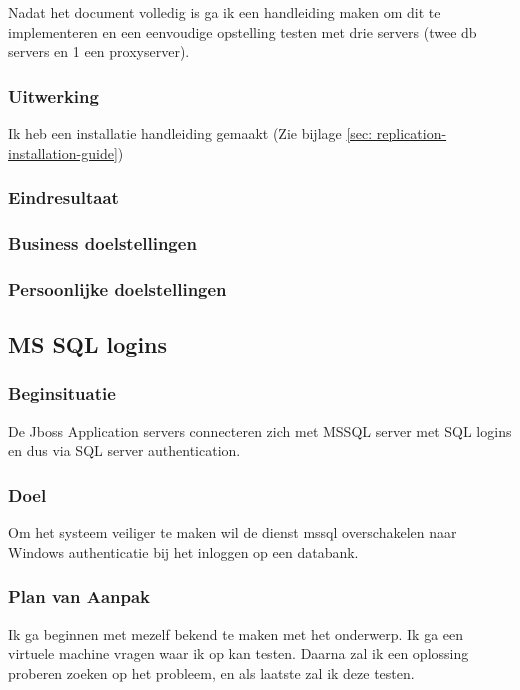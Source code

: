 Nadat het document volledig is ga ik een handleiding maken om dit te implementeren en een eenvoudige opstelling testen met drie servers (twee \gls{db} servers en 1 een proxyserver).

\subsubsection{Uitwerking}

Ik heb een installatie handleiding gemaakt (Zie bijlage \ref{sec: replication-installation-guide})

\subsubsection{Eindresultaat}
\subsubsection{Business doelstellingen}
\subsubsection{Persoonlijke doelstellingen}

\subsection{MS SQL logins}

\subsubsection{Beginsituatie}

De Jboss Application servers connecteren zich met MSSQL server met SQL logins en dus via SQL server authentication.

\subsubsection{Doel}

Om het systeem veiliger te maken wil de dienst \gls{mssql} overschakelen naar Windows authenticatie bij het inloggen op een databank.

\subsubsection{Plan van Aanpak}

Ik ga beginnen met mezelf bekend te maken met het onderwerp. Ik ga een virtuele machine vragen waar ik op kan testen. Daarna zal ik een oplossing proberen zoeken op het probleem, en als laatste zal ik deze testen.

